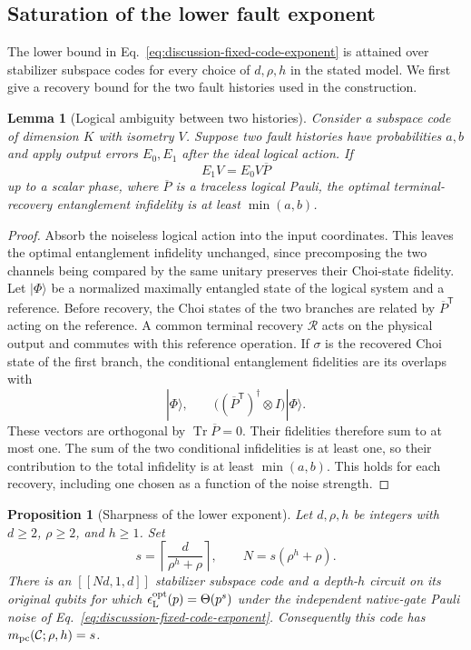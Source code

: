 \documentclass[aps,prl,reprint,notitlepage,nofootinbib,nobibnotes]{revtex4-2}
\newtheorem{lemma}{Lemma}
\newtheorem{proposition}{Proposition}
\newcommand{\id}{I}
\newcommand{\tr}{\operatorname{Tr}}
\begin{document}
\subsection*{Saturation of the lower fault exponent}
\label{em:lower-saturation}

The lower bound in Eq.~\eqref{eq:discussion-fixed-code-exponent} is attained over stabilizer subspace codes for every choice of \(d,\rho,h\) in the stated model. We first give a recovery bound for the two fault histories used in the construction.

\begin{lemma}[Logical ambiguity between two histories]
\label{lem:two-pauli-histories}
Consider a subspace code of dimension \(K\) with isometry \(V\). Suppose two fault histories have probabilities \(a,b\) and apply output errors \(E_0,E_1\) after the ideal logical action. If
\[
 E_1V=E_0V\overline P
\]
up to a scalar phase, where \(\overline P\) is a traceless logical Pauli, the optimal terminal-recovery entanglement infidelity is at least \(\min(a,b)\).
\end{lemma}

\begin{proof}
Absorb the noiseless logical action into the input coordinates. This leaves the optimal entanglement infidelity unchanged, since precomposing the two channels being compared by the same unitary preserves their Choi-state fidelity. Let \(|\Phi\rangle\) be a normalized maximally entangled state of the logical system and a reference. Before recovery, the Choi states of the two branches are related by \(\overline P^{\mathsf T}\) acting on the reference. A common terminal recovery \(\mathcal R\) acts on the physical output and commutes with this reference operation. If \(\sigma\) is the recovered Choi state of the first branch, the conditional entanglement fidelities are its overlaps with
\[
 |\Phi\rangle,\qquad
 \bigl((\overline P^{\mathsf T})^\dagger\otimes\id\bigr)|\Phi\rangle.
\]
These vectors are orthogonal by \(\tr\overline P=0\). Their fidelities therefore sum to at most one. The sum of the two conditional infidelities is at least one, so their contribution to the total infidelity is at least \(\min(a,b)\). This holds for each recovery, including one chosen as a function of the noise strength.
\end{proof}

\begin{proposition}[Sharpness of the lower exponent]
\label{prop:lower-saturation}
Let \(d,\rho,h\) be integers with \(d\ge2\), \(\rho\ge2\), and \(h\ge1\). Set
\begin{equation}\label{em:lower-parameters}
 s=\left\lceil\frac{d}{\rho^h+\rho}\right\rceil,\qquad
 N=s(\rho^h+\rho).
\end{equation}
There is an \([[Nd,1,d]]\) stabilizer subspace code and a depth-\(h\) circuit on its original qubits for which
\(\epsilon_{\rm L}^{\rm opt}(p)=\Theta(p^s)\) under the independent native-gate Pauli noise of Eq.~\eqref{eq:discussion-fixed-code-exponent}. Consequently this code has \(m_{\rm pc}(\mathcal C;\rho,h)=s\).
\end{proposition}
\end{document}
